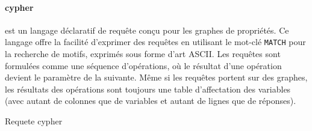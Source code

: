 \paragraph{\gls{cypher}}
est un langage déclaratif de requête conçu pour les graphes de propriétés.
Ce langage offre la facilité d'exprimer des requêtes en utilisant le mot-clé \verb|MATCH| pour la recherche de motifs, exprimés sous forme d'art ASCII.
Les requêtes sont formulées comme une séquence d'opérations, où le résultat d'une opération devient le paramètre de la suivante.
Même si les requêtes portent sur des graphes, les résultats des opérations sont toujours une table d'affectation des variables (avec autant de colonnes que de variables et autant de lignes que de réponses).

\begin{example}{Requete \gls{cypher}}
    
\end{example}
